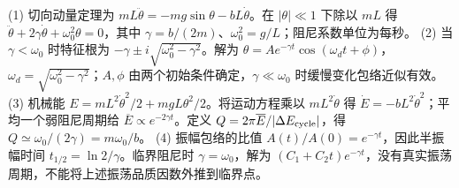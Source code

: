 (1) 切向动量定理为 \(mL\ddot\theta=-mg\sin\theta-bL\dot\theta\)。在 \(|\theta|\ll1\) 下除以 \(mL\) 得 \(\ddot\theta+2\gamma\dot\theta+\omega_0^2\theta=0\)，其中 \(\gamma=b/(2m)\)、\(\omega_0^2=g/L\)；阻尼系数单位为每秒。
(2) 当 \(\gamma<\omega_0\) 时特征根为 \(-\gamma\pm i\sqrt{\omega_0^2-\gamma^2}\)。解为 \(\theta=Ae^{-\gamma t}\cos(\omega_dt+\phi)\)，\(\omega_d=\sqrt{\omega_0^2-\gamma^2}\)；\(A,\phi\) 由两个初始条件确定，\(\gamma\ll\omega_0\) 时缓慢变化包络近似有效。
(3) 机械能 \(E=mL^2\dot\theta^2/2+mgL\theta^2/2\)。将运动方程乘以 \(mL^2\dot\theta\) 得 \(\dot E=-bL^2\dot\theta^2\)；平均一个弱阻尼周期给 \(\overline E\propto e^{-2\gamma t}\)。定义 \(Q=2\pi\overline E/|\Delta E_{\rm cycle}|\)，得 \(Q\simeq\omega_0/(2\gamma)=m\omega_0/b\)。
(4) 振幅包络的比值 \(A(t)/A(0)=e^{-\gamma t}\)，因此半振幅时间 \(t_{1/2}=\ln2/\gamma\)。临界阻尼时 \(\gamma=\omega_0\)，解为 \((C_1+C_2t)e^{-\gamma t}\)，没有真实振荡周期，不能将上述振荡品质因数外推到临界点。
